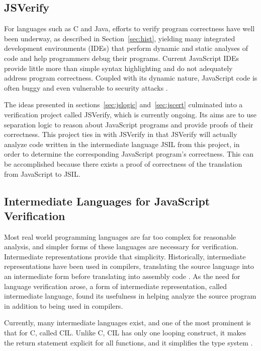 \documentclass[a4paper,11pt,twoside]{report}
\begin{document}
\subsection{JSVerify}\label{sec:jsverify}
For languages such as C and Java, efforts to verify program correctness have well been underway, as described in Section~\ref{sec:hist}, yielding many integrated development environments (IDEs) that perform dynamic and static analyses of code and help programmers debug their programs. Current JavaScript IDEs provide little more than simple syntax highlighting and do not adequately address program correctness. Coupled with its dynamic nature, JavaScript code is often buggy \cite{Gardner:2012} and even vulnerable to security attacks \cite{Lee:2007}. 

The ideas presented in sections~\ref{sec:jslogic} and~\ref{sec:jscert} culminated into a verification project called JSVerify, which is currently ongoing. Its aims are to use separation logic to reason about JavaScript programs and provide proofs of their correctness. This project ties in with JSVerify in that JSVerify will actually analyze code written in the intermediate language JSIL from this project, in order to determine the corresponding JavaScript program's correctness. This can be accomplished because there exists a proof of correctness of the translation from JavaScript to JSIL.

\subsection{Intermediate Languages for JavaScript Verification}\label{sec:ir}
Most real world programming languages are far too complex for reasonable analysis, and simpler forms of these languages are necessary for verification. Intermediate representations provide that simplicity. Historically, intermediate representations have been used in compilers, translating the source language into an intermediate form before translating into assembly code \cite{Necula2002}. As the need for language verification arose, a form of intermediate representation, called intermediate language, found its usefulness in helping analyze the source program in addition to being used in compilers.

Currently, many intermediate languages exist, and one of the most prominent is that for C, called CIL. Unlike C, CIL has only one looping construct, it makes the return statement explicit for all functions, and it simplifies the type system \cite{Necula2002}.
\end{document}
